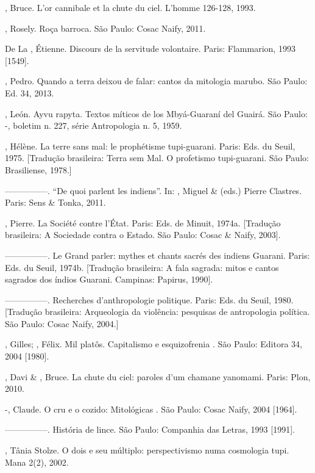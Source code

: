 \begin{Parskip}
, Bruce. L’or cannibale et la chute du ciel. L’homme 126-128,
1993.

 , Rosely. Roça barroca. São Paulo: Cosac Naify, 2011.

De La , Étienne. Discours de la servitude volontaire. Paris:
Flammarion, 1993 [1549].

, Pedro. Quando a terra deixou de falar: cantos da mitologia
marubo. São Paulo: Ed. 34, 2013.

, León. Ayvu rapyta. Textos míticos de los Mbyá-Guaraní del
Guairá. São Paulo: -, boletim n. 227, série Antropologia n. 5,
1959.

, Hélène. La terre sans mal: le prophétisme tupi-guarani. Paris:
Eds. du Seuil, 1975. [Tradução brasileira: Terra sem Mal. O profetismo
tupi-guarani. São Paulo: Brasiliense, 1978.]

—————. ``De quoi parlent les indiens''. In: , Miguel \& 
(eds.) Pierre Clastres. Paris: Sens \& Tonka, 2011.

, Pierre. La Société contre l’État. Paris: Eds. de Minuit,
1974a. [Tradução brasileira: A Sociedade contra o Estado. São Paulo:
Cosac \& Naify, 2003].

—————. Le Grand parler: mythes et chants sacrés des indiens Guarani.
Paris: Eds. du Seuil, 1974b. [Tradução brasileira: A fala sagrada:
mitos e cantos sagrados dos índios Guarani. Campinas: Papirus, 1990]. 

—————. Recherches d’anthropologie politique. Paris: Eds. du Seuil, 1980.
[Tradução brasileira: Arqueologia da violência: pesquisas de
antropologia política. São Paulo: Cosac Naify, 2004.] 

, Gilles; , Félix. Mil platôs. Capitalismo e
esquizofrenia . São Paulo: Editora 34, 2004 [1980].

, Davi \& , Bruce. La chute du ciel: paroles d’um chamane
yanomami. Paris: Plon, 2010.

-, Claude. O cru e o cozido: Mitológicas . São Paulo: Cosac
Naify, 2004 [1964].

—————. História de lince. São Paulo: Companhia das Letras, 1993 [1991]. 

, Tânia Stolze. O dois e seu múltiplo: perspectivismo numa
cosmologia tupi. Mana 2(2), 2002.


\end{Parskip}
